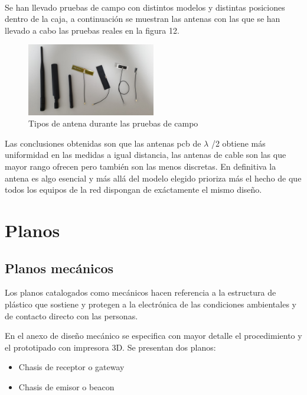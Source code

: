 \documentclass[a4paper ,12pt, onecolumn]{article}
\begin{document}
            \paragraph{}
            Se han llevado pruebas de campo con distintos modelos y distintas posiciones dentro de la caja, a continuación se muestran las 
            antenas con las que se han llevado a cabo las pruebas reales en la figura 12.
            \begin{center}
                \begin{figure}[ht]
                    \centering
                    \includegraphics[width=0.5\textwidth]{antennas_variety.jpeg}
                    \caption{Tipos de antena durante las pruebas de campo}
                    \label{fig:mesh11}
                \end{figure}
            \end{center}
            Las conclusiones obtenidas son que las antenas pcb de $\lambda$ /2 obtiene más uniformidad en las medidas a igual distancia, las 
            antenas de cable son las que mayor rango ofrecen pero también son las menos discretas. En definitiva la antena es algo esencial y más 
            allá del modelo elegido prioriza más el hecho de que todos los equipos de la red dispongan de exáctamente el mismo diseño.
\section{Planos}
    \subsection{Planos mecánicos}
        Los planos catalogados como mecánicos hacen referencia a la estructura de plástico
        que sostiene y protegen a la electrónica de las condiciones ambientales y de contacto directo con las 
        personas.

        En el anexo de diseño mecánico se especifica con mayor detalle el procedimiento y el prototipado con impresora
        3D. Se presentan dos planos:
        \begin{itemize}
            \item Chasis de receptor o gateway
            \item Chasis de emisor o beacon
        \end{itemize}
\end{document}
